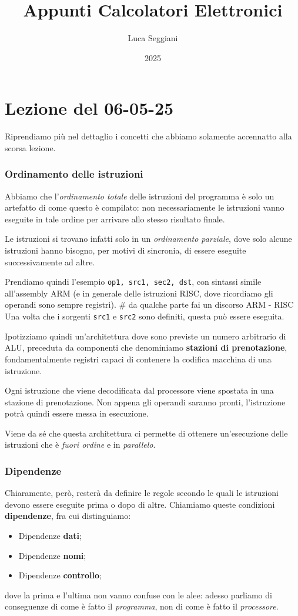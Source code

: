 \documentclass[a4paper,11pt]{article}
\title{Appunti Calcolatori Elettronici}
\author{Luca Seggiani}
\date{2025}
\begin{document}
\section{Lezione del 06-05-25}

\thispagestyle{empty}
\pagestyle{fancy}

Riprendiamo più nel dettaglio i concetti che abbiamo solamente accennatto alla scorsa lezione.

\subsubsection{Ordinamento delle istruzioni}
Abbiamo che l'\textit{ordinamento totale} delle istruzioni del programma è solo un artefatto di come questo è compilato: non necessariamente le istruzioni vanno eseguite in tale ordine per arrivare allo stesso risultato finale.

Le istruzioni si trovano infatti solo in un \textit{ordinamento parziale}, dove solo alcune istruzioni hanno bisogno, per motivi di sincronia, di essere eseguite successivamente ad altre.

Prendiamo quindi l'esempio \lstinline|op1, src1, sec2, dst|, con sintassi simile all'assembly ARM (e in generale delle istruzioni RISC, dove ricordiamo gli operandi sono sempre registri). # da qualche parte fai un discorso ARM - RISC
Una volta che i sorgenti \lstinline|src1| e \lstinline|src2| sono definiti, questa può essere eseguita.

Ipotizziamo quindi un'architettura dove sono previste un numero arbitrario di ALU, preceduta da componenti che denominiamo \textbf{stazioni di prenotazione}, fondamentalmente registri capaci di contenere la codifica macchina di una istruzione.

Ogni istruzione che viene decodificata dal processore viene spostata in una stazione di prenotazione. 
Non appena gli operandi saranno pronti, l'istruzione potrà quindi essere messa in esecuzione.

Viene da sé che questa architettura ci permette di ottenere un'esecuzione delle istruzioni che è \textit{fuori ordine} e in \textit{parallelo}.

\subsubsection{Dipendenze}
Chiaramente, però, resterà da definire le regole secondo le quali le istruzioni devono essere eseguite prima o dopo di altre.
Chiamiamo queste condizioni \textbf{dipendenze}, fra cui distinguiamo:
\begin{itemize}
	\item Dipendenze \textbf{dati};
	\item Dipendenze \textbf{nomi};
	\item Dipendenze \textbf{controllo};
\end{itemize}
dove la prima e l'ultima non vanno confuse con le alee: adesso parliamo di conseguenze di come è fatto il \textit{programma}, non di come è fatto il \textit{processore}.
\end{document}
